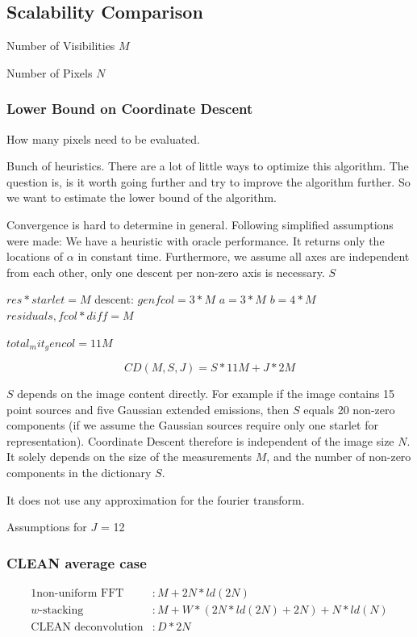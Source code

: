 \subsection{Scalability Comparison}

Number of Visibilities $M$

Number of Pixels $N$

\subsubsection{Lower Bound on Coordinate Descent}
How many pixels need to be evaluated.

Bunch of heuristics. There are a lot of little ways to optimize this algorithm. The question is, is it worth going further and try to improve the algorithm further. So we want to estimate the lower bound of the algorithm.

Convergence is hard to determine in general. Following simplified assumptions were made: We have a heuristic with oracle performance. It returns only the locations of $\alpha$ in constant time. Furthermore, we assume all axes are independent from each other, only one descent per non-zero axis is necessary.
$S$

$res * starlet = M$
descent:
$gen fcol = 3*M$
$a = 3 * M$
$b = 4 * M$
$residuals, fcol*diff =  M$

$total_mit_gencol = 11M$

\begin{equation}\label{results:cd:omega}
	CD(M, S, J) = S * 11M + J * 2M
\end{equation}

$S$ depends on the image content directly. For example if the image contains 15 point sources and five Gaussian extended emissions, then $S$ equals 20 non-zero components (if we assume the Gaussian sources require only one starlet for representation). Coordinate Descent therefore is independent of the image size $N$. It solely depends on the size of the measurements $M$, and the number of non-zero components in the dictionary $S$. 

It does not use any approximation for the fourier transform.

Assumptions for $J$ = 12

\subsubsection{CLEAN average case}

\begin{alignat*}{1}
	\text{non-uniform FFT} &: M + 2N*ld(2N)\\
	w \text{-stacking} &:M + W*(2N*ld(2N) + 2N) + N*ld(N)\\
	\text{CLEAN deconvolution} &: D*2N
\end{alignat*}

